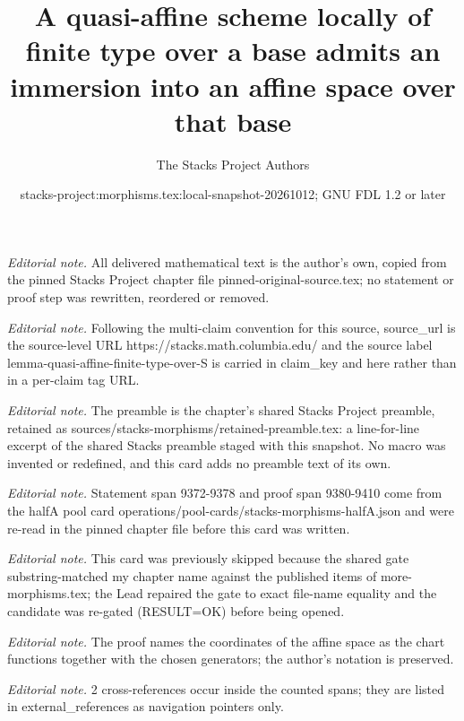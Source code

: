 \documentclass[10pt,a4paper]{amsart}
\title{A quasi-affine scheme locally of finite type over a base admits an immersion into an affine space over that base}
\author{The Stacks Project Authors}
\date{stacks-project:morphisms.tex:local-snapshot-20261012; GNU FDL 1.2 or later}
\theoremstyle{plain}
\theoremstyle{definition}
\theoremstyle{remark}
\numberwithin{equation}{subsection}
\begin{document}
\maketitle
\noindent\textit{Editorial note.} All delivered mathematical text is the author's own, copied from the pinned Stacks Project chapter file pinned-original-source.tex; no statement or proof step was rewritten, reordered or removed.\par\medskip
\noindent\textit{Editorial note.} Following the multi-claim convention for this source, source\_url is the source-level URL https://stacks.math.columbia.edu/ and the source label lemma-quasi-affine-finite-type-over-S is carried in claim\_key and here rather than in a per-claim tag URL.\par\medskip
\noindent\textit{Editorial note.} The preamble is the chapter's shared Stacks Project preamble, retained as sources/stacks-morphisms/retained-preamble.tex: a line-for-line excerpt of the shared Stacks preamble staged with this snapshot. No macro was invented or redefined, and this card adds no preamble text of its own.\par\medskip
\noindent\textit{Editorial note.} Statement span 9372-9378 and proof span 9380-9410 come from the halfA pool card operations/pool-cards/stacks-morphisms-halfA.json and were re-read in the pinned chapter file before this card was written.\par\medskip
\noindent\textit{Editorial note.} This card was previously skipped because the shared gate substring-matched my chapter name against the published items of more-morphisms.tex; the Lead repaired the gate to exact file-name equality and the candidate was re-gated (RESULT=OK) before being opened.\par\medskip
\noindent\textit{Editorial note.} The proof names the coordinates of the affine space as the chart functions together with the chosen generators; the author's notation is preserved.\par\medskip
\noindent\textit{Editorial note.} 2 cross-references occur inside the counted spans; they are listed in external\_references as navigation pointers only.\par\medskip
\end{document}
